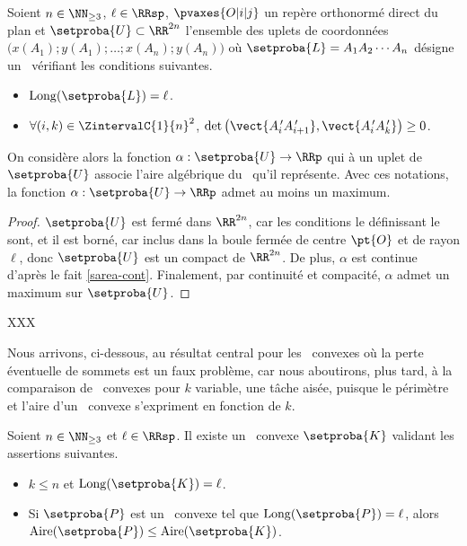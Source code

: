 \begin{fact} \label{at-least-one-ncycle}
    Soient $n \in \NN_{\geq3}$,
    $\ell \in \RRsp$,
    $\pvaxes{O | i | j}$ un repère orthonormé direct du plan
    et
    $\setproba{U} \subset \RR^{2n}$ l'ensemble des uplets de coordonnées $\big( x(A_1) ; y(A_1) ; \dots ; x(A_n) ; y(A_n) \big)$ où $\setproba{L} = A_1 A_2 \cdots A_n$ désigne un \ncycle\ vérifiant les conditions suivantes.
    \begin{itemize}
        \item $\cyclelen{\setproba{L}} = \ell$.
    
        \item  $\forall (i, k) \in \ZintervalC{1}{n}^2$,
		$\det \big( \vect{A^{\,\prime}_i A^{\,\prime}_{i+1}}, \vect{A^{\,\prime}_i A^{\,\prime}_k} \big) \geq 0$.
    \end{itemize}
    
    On considère alors la fonction $\alpha: \setproba{U} \rightarrow \RRp$ qui à un uplet de $\setproba{U}$ associe l'aire algébrique du \ncycle\ qu'il représente.
	Avec ces notations, la fonction $\alpha: \setproba{U} \rightarrow \RRp$ admet au moins un maximum.
\end{fact}


\begin{proof}
     $\setproba{U}$ est fermé dans $\RR^{2n}$, car les conditions le définissant le sont, et il est borné, car inclus dans la boule fermée de centre $\pt{O}$ et de rayon $\ell$,
     donc $\setproba{U}$ est un compact de $\RR^{2n}$.
     De plus, $\alpha$ est continue d'après le fait \ref{sarea-cont}.
     Finalement, par continuité et compacité, $\alpha$ admet un maximum sur $\setproba{U}$.
\end{proof}




\newpage %
XXX

Nous arrivons, ci-dessous, au résultat central pour les \ngones\ convexes où la perte éventuelle de sommets est un faux problème, car nous aboutirons, plus tard, à la comparaison de \kregs\ convexes pour $k$ variable, une tâche aisée, puisque le périmètre et l'aire d'un \kreg\ convexe s'expriment en fonction de $k$.


\begin{fact} \label{at-least-one-kgone}
    Soient $n \in \NN_{\geq3}$ et $\ell \in \RRsp$.
    Il existe un \kgone\ convexe $\setproba{K}$ validant les assertions suivantes.
	\begin{itemize}
		\item $k \leq n$ et $\cyclelen{\setproba{K}} = \ell$.

		\item Si $\setproba{P}$ est un \ngone\ convexe tel que $\cyclelen{\setproba{P}} = \ell$, alors $\area{\setproba{P}} \leq \area{\setproba{K}}$.
    \end{itemize}
\end{fact}


